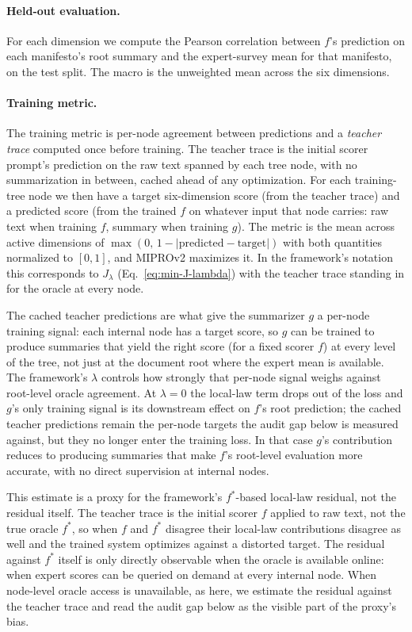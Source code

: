 \paragraph{Held-out evaluation.}
For each dimension we compute the Pearson correlation between $f$'s
prediction on each manifesto's root summary and the expert-survey
mean for that manifesto, on the test split. The macro is the
unweighted mean across the six dimensions.

\paragraph{Training metric.}
The training metric is per-node agreement between predictions and
a \emph{teacher trace} computed once before training. The teacher
trace is the initial scorer prompt's prediction on the raw text
spanned by each tree node, with no summarization in between, cached
ahead of any optimization. For each training-tree node we then have
a target six-dimension score (from the teacher trace) and a
predicted score (from the trained $f$ on whatever input that node
carries: raw text when training $f$, summary when training $g$).
The metric is the mean across active dimensions of
$\max\!\left(0,\, 1 - \left|\text{predicted} - \text{target}\right|\right)$
with both quantities normalized to $[0, 1]$, and MIPROv2 maximizes
it. In the framework's notation this corresponds to $J_\lambda$
(Eq.~\ref{eq:min-J-lambda}) with the teacher trace standing in for
the oracle at every node. 

The cached teacher predictions are what give the summarizer $g$ a
per-node training signal: each internal node has a target score, so
$g$ can be trained to produce summaries that yield the right score
(for a fixed scorer $f$) at every level of the tree, not just at
the document root where the expert mean is available. The
framework's $\lambda$ controls how strongly that per-node signal
weighs against root-level oracle agreement. At $\lambda = 0$ the
local-law term drops out of the loss and $g$'s only training signal
is its downstream effect on $f$'s root prediction; the cached
teacher predictions remain the per-node targets the audit gap below
is measured against, but they no longer enter the training loss. In
that case $g$'s contribution reduces to producing summaries that
make $f$'s root-level evaluation more accurate, with no direct
supervision at internal nodes.

This estimate is a proxy for the framework's $f^*$-based local-law
residual, not the residual itself. The teacher trace is the initial
scorer $f$ applied to raw text, not the true oracle $f^*$, so when
$f$ and $f^*$ disagree their local-law contributions disagree as
well and the trained system optimizes against a distorted target.
The residual against $f^*$ itself is only directly observable when
the oracle is available online: when expert scores can be queried
on demand at every internal node. When node-level oracle access is
unavailable, as here, we estimate the residual against the teacher
trace and read the audit gap below as the visible part of the
proxy's bias.

